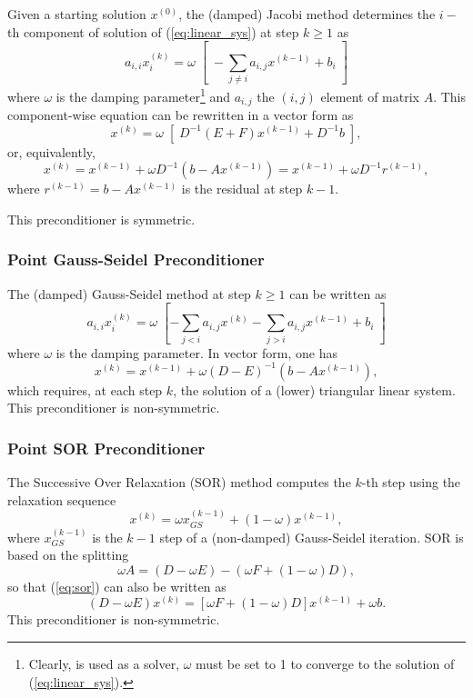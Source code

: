 Given a starting solution $x^{(0)}$, the (damped) Jacobi method determines 
the $i-$th component of 
solution of (\ref{eq:linear_sys}) at step $k \geq 1$ as
\[
a_{i,i} x^{(k)}_i = \omega \; \left[  \;- \sum_{j \neq i} a_{i,j} x^{(k-1)} + b_i
\; \right]
\]
where $\omega$ is the damping parameter\footnote{Clearly, is used as a
  solver, $\omega$ must be set to 1 to converge to the solution of
    (\ref{eq:linear_sys}).} and
$a_{i,j}$ the $(i,j)$ element of matrix $A$.
This component-wise equation can be rewritten in a vector form as
\[
x^{(k)} = \omega \; \left[ \; D^{-1} (E+F) x ^{(k-1)} + D^{-1} b \; \right],
\]
or, equivalently,
\begin{equation}
\label{eq:jacobi}
x^{(k)} = x^{(k-1)} + \omega D^{-1} (b - A x ^{(k-1)} ) =
          x^{(k-1)} + \omega D^{-1} r^{(k-1)},
\end{equation}
where $r^{(k-1)} = b - A x ^{(k-1)}$ is the residual at step $k-1$. 

This preconditioner is symmetric.

\subsubsection{Point Gauss-Seidel Preconditioner}
\label{sec:gs}

The (damped) Gauss-Seidel method at step $k \geq 1$ can be written as
\[
a_{i,i} x^{(k)}_i = \omega \; 
 \left[- \sum_{j<i} a_{i,j} x^{(k)} 
			   - \sum_{j>i} a_{i,j} x^{(k-1)} + b_i
			   \; \right]
\]
where $\omega$ is the damping parameter. In vector form, one has
\begin{equation}
\label{eq:gs}
x^{(k)} = x^{(k-1)} + \omega (D - E)^{-1} (b - A x ^{(k-1)} ) ,
\end{equation}
which requires, at each step $k$, the solution of a (lower) triangular 
linear system. This preconditioner is non-symmetric.

\subsubsection{Point SOR Preconditioner}
\label{sec:sor}

The Successive Over Relaxation (SOR) method computes the $k$-th step 
using the relaxation sequence
\begin{equation}
\label{eq:sor}
x^{(k)} = \omega x_{GS}^{(k-1)} + (1 - \omega) x^{(k-1)}, 
\end{equation}
where $x_{GS}^{(k-1)}$ is the $k-1$ step of a (non-damped) Gauss-Seidel
iteration. SOR is based on the splitting 
\[
\omega A = (D - \omega E) - (\omega F + (1 - \omega) D ) ,
\]
so that (\ref{eq:sor}) can also be written as
\[
(D - \omega E) x^{(k)} = \left[
\omega F + (1 - \omega ) D
\right] x^{(k-1)} + \omega b.
\]
This preconditioner is non-symmetric.


